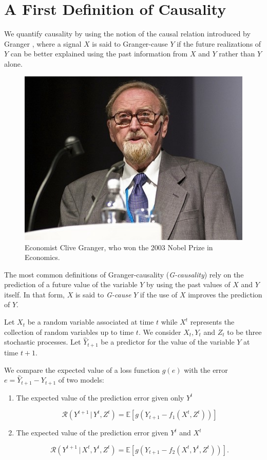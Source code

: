 \documentclass[]{book}
\providecommand{\tightlist}{%
  \setlength{\itemsep}{0pt}\setlength{\parskip}{0pt}}
\theoremstyle{definition}
\theoremstyle{definition}
\theoremstyle{definition}
\theoremstyle{remark}
\begin{document}
\section{A First Definition of Causality}\label{LinearG}

We quantify causality by using the notion of the causal relation
introduced by Granger \citep{Wiener56, granger:econ}, where a signal
\(X\) is said to Granger-cause \(Y\) if the future realizations of \(Y\)
can be better explained using the past information from \(X\) and \(Y\)
rather than \(Y\) alone.

\begin{figure}[H]

{\centering \includegraphics[width=0.5\linewidth]{./chapters/TransferEntropy/G} 

}

\caption{Economist Clive Granger, who won the 2003 Nobel Prize in Economics.}\label{fig:G}
\end{figure}

The most common definitions of Granger-causality (\emph{G-causality})
rely on the prediction of a future value of the variable \(Y\) by using
the past values of \(X\) and \(Y\) itself. In that form, \(X\) is said
to \emph{G-cause} \(Y\) if the use of \(X\) improves the prediction of
\(Y\).

Let \(X_t\) be a random variable associated at time \(t\) while \(X^t\)
represents the collection of random variables up to time \(t\). We
consider \({X_t}, {Y_t}\) and \({Z_t}\) to be three stochastic
processes. Let \(\hat Y_{t+1}\) be a predictor for the value of the
variable \(Y\) at time \(t+1\).

We compare the expected value of a loss function \(g(e)\) with the error
\(e=\hat{Y}_{t+1} - Y_{t+1}\) of two models:

\begin{enumerate}
\def\labelenumi{\arabic{enumi}.}
\tightlist
\item
  The expected value of the prediction error given only \(Y^t\)

  \begin{equation}
   \mathcal{R}(Y^{t+1} \, | \, Y^t,Z^t) = \mathbb{E}[g(Y_{t+1} - f_1(X^{t},Z^t))]
  \end{equation}
\item
  The expected value of the prediction error given \(Y^t\) and \(X^t\)

  \begin{equation}
   \mathcal{R}(Y^{t+1} \, | \, X^{t},Y^t,Z^t) = \mathbb{E}[g(Y_{t+1} - f_2(X^{t},Y^t,Z^t))].
  \end{equation}
\end{enumerate}
\end{document}

